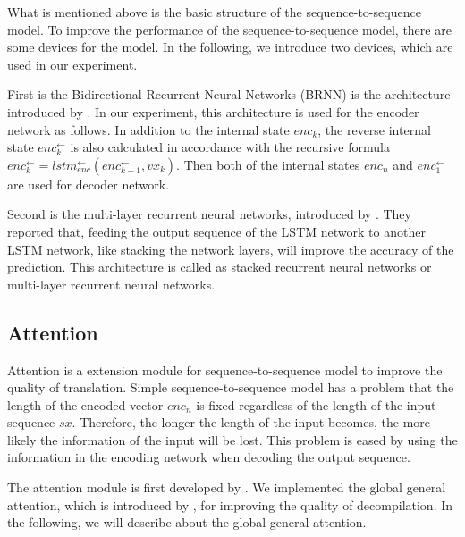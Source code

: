 \documentclass[senior,final,11pt]{iscs-thesis}
\begin{document}


What is mentioned above is the basic structure of the sequence-to-sequence model.
To improve the performance of the sequence-to-sequence model, there are some devices for the model.
In the following, we introduce two devices, which are used in our experiment.

First is the Bidirectional Recurrent Neural Networks (BRNN) is the architecture introduced by \citet{BiRNN}.
In our experiment, this architecture is used for the encoder network as follows.
In addition to the internal state $ enc_{k} $, the reverse internal state $ enc_{k}^{\gets} $ is also calculated 
in accordance with the recursive formula $ enc_{k}^{\gets} = lstm_{enc}^{\gets}(enc_{k+1}^{\gets},vx_{k}) $.
Then both of the internal states $ enc_{n} $ and $ enc_{1}^{\gets} $ are used for decoder network.

Second is the multi-layer recurrent neural networks, introduced by \citet{multi_layer}.
They reported that, feeding the output sequence of the LSTM network to another LSTM network, like stacking the network layers, will improve the accuracy of the prediction.
This architecture is called as stacked recurrent neural networks or multi-layer recurrent neural networks.





\subsection{Attention}
Attention is a extension module for sequence-to-sequence model to improve the quality of translation. 
Simple sequence-to-sequence model has a problem that the length of the encoded vector $enc_{n}$ is fixed 
regardless of the length of the input sequence $sx$. 
Therefore, the longer the length of the input becomes, the more likely the information of the input will be lost.
This problem is eased by using the information in the encoding network when decoding the output sequence.

The attention module is first developed by \citet{attention_paper}.
We implemented the global general attention, which is introduced by \citet{dot_attention}, for improving the quality of decompilation.
In the following, we will describe about the global general attention.
\end{document}
